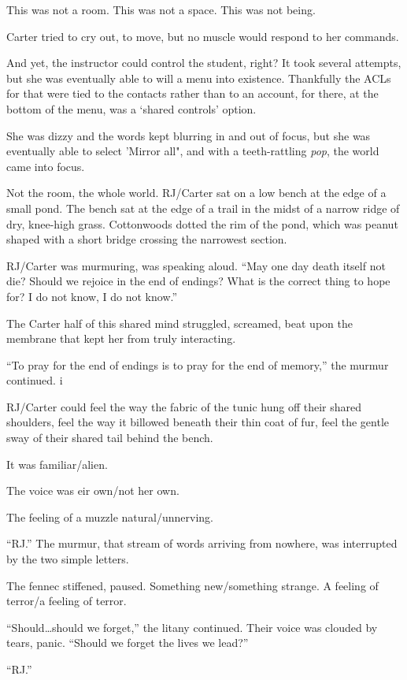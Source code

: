 This was not a room. This was not a space. This was not being.

Carter tried to cry out, to move, but no muscle would respond to her commands.

And yet, the instructor could control the student, right? It took several attempts, but she was eventually able to will a menu into existence. Thankfully the ACLs for that were tied to the contacts rather than to an account, for there, at the bottom of the menu, was a `shared controls' option.

She was dizzy and the words kept blurring in and out of focus, but she was eventually able to select 'Mirror all", and with a teeth-rattling \emph{pop}, the world came into focus.

Not the room, the whole world. RJ/Carter sat on a low bench at the edge of a small pond. The bench sat at the edge of a trail in the midst of a narrow ridge of dry, knee-high grass. Cottonwoods dotted the rim of the pond, which was peanut shaped with a short bridge crossing the narrowest section.

RJ/Carter was murmuring, was speaking aloud. ``May one day death itself not die? Should we rejoice in the end of endings? What is the correct thing to hope for? I do not know, I do not know.''

The Carter half of this shared mind struggled, screamed, beat upon the membrane that kept her from truly interacting.

``To pray for the end of endings is to pray for the end of memory,'' the murmur continued. i

RJ/Carter could feel the way the fabric of the tunic hung off their shared shoulders, feel the way it billowed beneath their thin coat of fur, feel the gentle sway of their shared tail behind the bench.

It was familiar/alien.

The voice was eir own/not her own.

The feeling of a muzzle natural/unnerving.

``RJ.'' The murmur, that stream of words arriving from nowhere, was interrupted by the two simple letters.

The fennec stiffened, paused. Something new/something strange. A feeling of terror/a feeling of terror.

``Should\ldots{}should we forget,'' the litany continued. Their voice was clouded by tears, panic. ``Should we forget the lives we lead?''

``RJ.''

